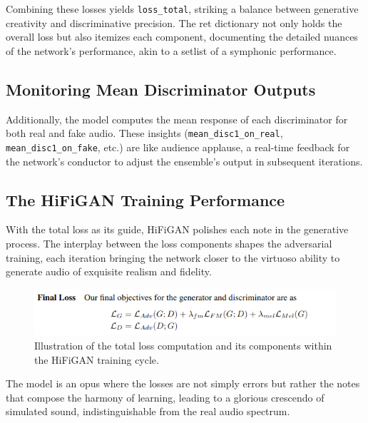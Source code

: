 \documentclass[a4paper]{article}
\begin{document}
Combining these losses yields \verb|loss_total|, striking a balance between generative creativity and discriminative precision. The ret dictionary not only holds the overall loss but also itemizes each component, documenting the detailed nuances of the network's performance, akin to a setlist of a symphonic performance.

\subsection*{Monitoring Mean Discriminator Outputs}

Additionally, the model computes the mean response of each discriminator for both real and fake audio. These insights (\verb|mean_disc1_on_real|, \verb|mean_disc1_on_fake|, etc.) are like audience applause, a real-time feedback for the network's conductor to adjust the ensemble's output in subsequent iterations.

\subsection*{The HiFiGAN Training Performance}

With the total loss as its guide, HiFiGAN polishes each note in the generative process. The interplay between the loss components shapes the adversarial training, each iteration bringing the network closer to the virtuoso ability to generate audio of exquisite realism and fidelity.

\begin{figure}[ht]
  \centering
  \includegraphics[width=\linewidth]{hifigan-loss-functions.png}
  \caption{Illustration of the total loss computation and its components within the HiFiGAN training cycle.}
  \label{fig:hifigan-loss-functions}
\end{figure}

The model is an opus where the losses are not simply errors but rather the notes that compose the harmony of learning, leading to a glorious crescendo of simulated sound, indistinguishable from the real audio spectrum.

\end{document}
